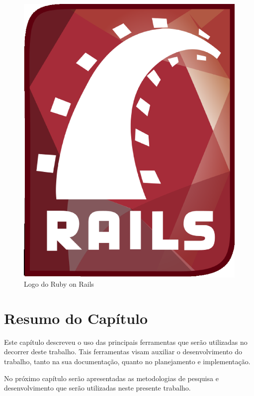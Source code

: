 \begin{figure}[!h]
	\centering
	\includegraphics[scale=0.1]{figuras/capitulo3/ruby_on_rails.eps}
	\caption{Logo do Ruby on Rails}
	\label{ruby_on_rails}
\end{figure}

\section{Resumo do Capítulo}

Este capítulo descreveu o uso das principais ferramentas que serão utilizadas no decorrer deste trabalho. Tais ferramentas visam auxiliar o desenvolvimento do trabalho, tanto na sua documentação, quanto no planejamento e implementação.

No próximo capítulo serão apresentadas as metodologias de pesquisa e desenvolvimento que serão utilizadas neste presente trabalho.
